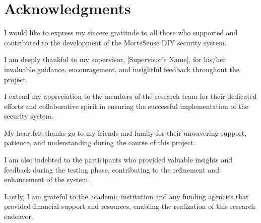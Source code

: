 \section*{Acknowledgments}

I would like to express my sincere gratitude to all those who supported and contributed to the development of the MorteSense DIY security system.

I am deeply thankful to my supervisor, [Supervisor's Name], for his/her invaluable guidance, encouragement, and insightful feedback throughout the project.

I extend my appreciation to the members of the research team for their dedicated efforts and collaborative spirit in ensuring the successful implementation of the security system.

My heartfelt thanks go to my friends and family for their unwavering support, patience, and understanding during the course of this project.

I am also indebted to the participants who provided valuable insights and feedback during the testing phase, contributing to the refinement and enhancement of the system.

Lastly, I am grateful to the academic institution and any funding agencies that provided financial support and resources, enabling the realization of this research endeavor.

